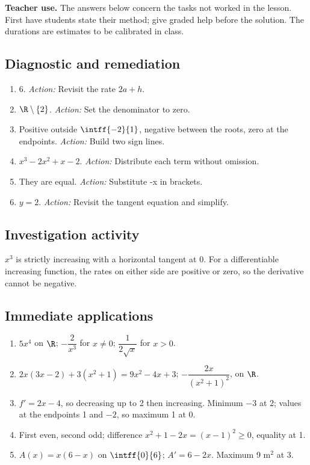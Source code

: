 \label{C06-CORR}
\textbf{Teacher use.} The answers below concern the tasks not worked in the lesson. First have students state their method; give graded help before the solution. The durations are estimates to be calibrated in class.
\subsection*{Diagnostic and remediation}
\begin{enumerate}
\item $6$. \textit{Action:} Revisit the rate $2a+h$.
\item $\R\setminus\{2\}$. \textit{Action:} Set the denominator to zero.
\item Positive outside $\intff{-2}{1}$, negative between the roots, zero at the endpoints. \textit{Action:} Build two sign lines.
\item $x^3-2x^2+x-2$. \textit{Action:} Distribute each term without omission.
\item They are equal. \textit{Action:} Substitute -x in brackets.
\item $y=2$. \textit{Action:} Revisit the tangent equation and simplify.
\end{enumerate}
\subsection*{Investigation activity}
$x^3$ is strictly increasing with a horizontal tangent at 0. For a differentiable increasing function, the rates on either side are positive or zero, so the derivative cannot be negative.
\subsection*{Immediate applications}
\begin{enumerate}
\item $5x^4$ on $\R$; $-\dfrac{2}{x^3}$ for $x\ne0$; $\dfrac{1}{2\sqrt x}$ for $x>0$.
\item $2x(3x-2)+3(x^2+1)=9x^2-4x+3$; $-\dfrac{2x}{(x^2+1)^2}$, on $\R$.
\item $f\prime=2x-4$, so decreasing up to 2 then increasing. Minimum $-3$ at 2; values at the endpoints 1 and $-2$, so maximum 1 at 0.
\item First even, second odd; difference $x^2+1-2x=(x-1)^2\geq0$, equality at 1.
\item $A(x)=x(6-x)$ on $\intff{0}{6}$; $A\prime=6-2x$. Maximum 9 m$^2$ at 3.
\end{enumerate}
